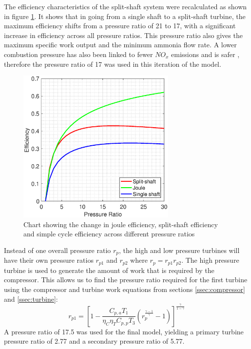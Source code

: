 \documentclass[11pt, oneside]{article}
\begin{document}
The efficiency characteristics of the split-shaft system were recalculated as shown in figure \ref{fig:twinefficiency}. It shows that in going from a single shaft to a split-shaft turbine, the maximum efficiency shifts from a pressure ratio of 21 to 17, with a significant increase in efficiency across all pressure ratios. This pressure ratio also gives the maximum specific work output and the minimum ammonia flow rate. A lower combustion pressure has also been linked to fewer $NO_x$ emissions and is safer \cite{junLi}, therefore the pressure ratio of 17 was used in this iteration of the model. 
\begin{figure} [h]
\centering
\includegraphics[width=0.7\textwidth]{./pictures/efficiencyPT.eps}
  \caption{Chart showing the change in joule efficiency, split-shaft efficiency and simple cycle efficiency across different pressure ratios} \label{fig:twinefficiency}
  \end{figure}
  
Instead of one overall pressure ratio $r_p$, the high and low pressure turbines will have their own pressure ratios $r_{p1}$ and $r_{p2}$ where $r_p = r_{p1} r_{p2}$. The high pressure turbine is used to generate the amount of work that is required by the compressor. This allows us to find the pressure ratio required for the first turbine using the compressor and turbine work equations from sections \ref{ssec:compressor} and \ref{ssec:turbine}:
\begin{equation}
r_{p1} = [1-\frac{C_{p, a} T_1}{\eta_C \eta_T C_{p, p} T_3} (r_p^\frac{\gamma -1}{\gamma}-1)]^{\frac{\gamma}{1-\gamma}}
\end{equation} %
A pressure ratio of 17.5 was used for the final model, yielding a primary turbine pressure ratio of 2.77 and a secondary pressure ratio of 5.77.
\end{document}
